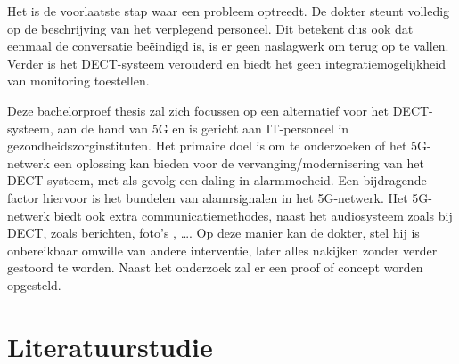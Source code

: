 Het is de voorlaatste stap waar een probleem optreedt. De dokter steunt volledig op de beschrijving van het verplegend personeel. Dit betekent dus ook dat eenmaal de conversatie beëindigd is, is er geen naslagwerk om terug op te vallen. Verder is het DECT-systeem verouderd en biedt het geen integratiemogelijkheid van monitoring toestellen.

Deze bachelorproef thesis zal zich focussen op een alternatief voor het DECT-systeem, aan de hand van 5G en is gericht aan IT-personeel in gezondheidszorginstituten. Het primaire doel is om te onderzoeken of het 5G-netwerk een oplossing kan bieden voor de vervanging/modernisering van het DECT-systeem, met als gevolg een daling in alarmmoeheid. Een bijdragende factor hiervoor is het bundelen van alamrsignalen in het 5G-netwerk. Het 5G-netwerk biedt ook extra communicatiemethodes, naast het audiosysteem zoals bij DECT, zoals berichten, foto's , \dots . Op deze manier kan de dokter, stel hij is onbereikbaar omwille van andere interventie, later alles nakijken zonder verder gestoord te worden. Naast het onderzoek zal er een proof of concept worden opgesteld. 


\section{Literatuurstudie}%
\label{sec:literatuurstudie}


